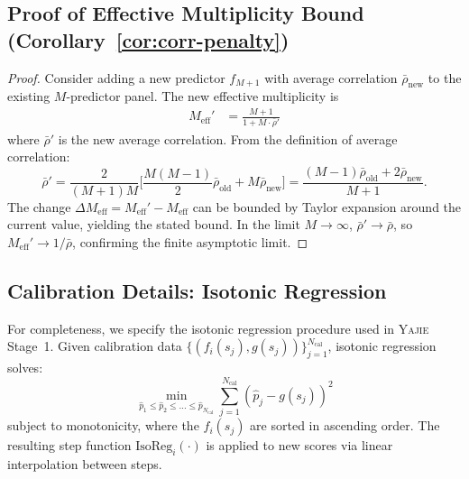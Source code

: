 \documentclass[11pt,a4paper]{article}
\theoremstyle{definition}
\newcommand{\yajie}{\textsc{Yajie}}
\begin{document}
\subsection{Proof of Effective Multiplicity Bound (Corollary~\ref{cor:corr-penalty})}
\begin{proof}
Consider adding a new predictor $f_{M+1}$ with average correlation $\bar{\rho}_{\text{new}}$ to the existing $M$-predictor panel.
The new effective multiplicity is
\begin{align}
    M_{\text{eff}}' &= \frac{M+1}{1 + M \cdot \bar{\rho}'}
\end{align}
where $\bar{\rho}'$ is the new average correlation.
From the definition of average correlation:
\begin{equation}
    \bar{\rho}' = \frac{2}{(M+1)M}\Big[\frac{M(M-1)}{2}\bar{\rho}_{\text{old}} + M \bar{\rho}_{\text{new}}\Big] = \frac{(M-1)\bar{\rho}_{\text{old}} + 2\bar{\rho}_{\text{new}}}{M+1}.
\end{equation}
The change $\Delta M_{\text{eff}} = M_{\text{eff}}' - M_{\text{eff}}$ can be bounded by Taylor expansion around the current value, yielding the stated bound.
In the limit $M \to \infty$, $\bar{\rho}' \to \bar{\rho}$, so $M_{\text{eff}}' \to 1/\bar{\rho}$, confirming the finite asymptotic limit.
\end{proof}
\subsection{Calibration Details: Isotonic Regression}
For completeness, we specify the isotonic regression procedure used in \yajie{} Stage~1.
Given calibration data $\{(f_i(s_j), g(s_j))\}_{j=1}^{N_{\text{cal}}}$, isotonic regression solves:
\begin{equation}
    \min_{\hat{p}_1 \leq \hat{p}_2 \leq \dots \leq \hat{p}_{N_{\text{cal}}}} \sum_{j=1}^{N_{\text{cal}}} (\hat{p}_j - g(s_j))^2
\end{equation}
subject to monotonicity, where the $f_i(s_j)$ are sorted in ascending order.
The resulting step function $\text{IsoReg}_i(\cdot)$ is applied to new scores via linear interpolation between steps.
\end{document}
